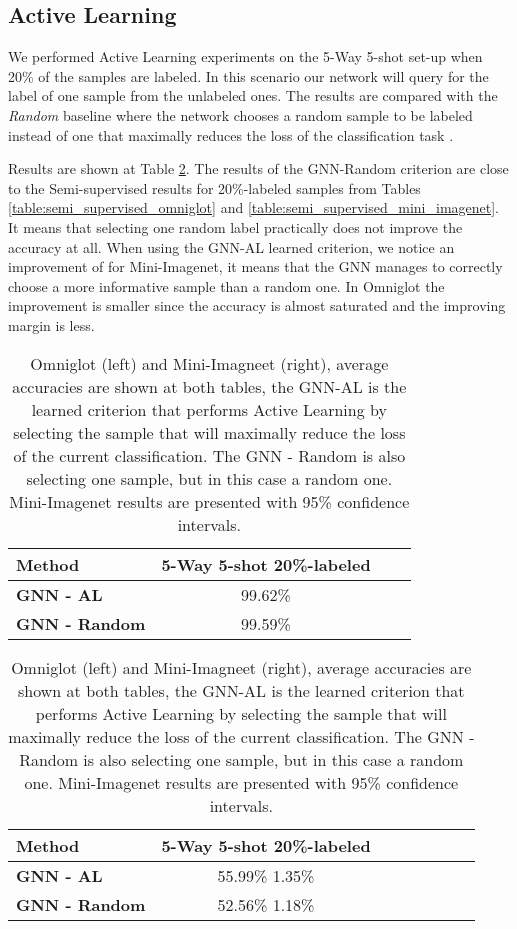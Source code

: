 \documentclass{article} \usepackage{iclr2018_conference,times}
\begin{document}
\subsection{Active Learning}
We performed Active Learning experiments on the 5-Way 5-shot set-up when 20\% of the samples are labeled. In this scenario our network will query for the label of one sample from the unlabeled ones. The results are compared with the \textit{Random} baseline where the network chooses a random sample to be labeled instead of one that maximally reduces the loss of the classification task .

Results are shown at Table \ref{fig:dummy_gaussian_warm}. The results of the GNN-Random criterion are close to the Semi-supervised results for 20\%-labeled samples from Tables \ref{table:semi_supervised_omniglot} and \ref{table:semi_supervised_mini_imagenet}. It means that selecting one random label practically does not improve the accuracy at all. When using the GNN-AL learned criterion, we notice an improvement of  for Mini-Imagenet, it means that the GNN manages to correctly choose a more informative sample than a random one. In Omniglot the improvement is smaller since the accuracy is almost saturated and the improving margin is less.


\begin{table}[!htb]
    \centering
    \tabcolsep=0.11cm
    \begin{tabular}{l*{2}{c}r}
    
    \textbf{Method}             & \textbf{5-Way 5-shot 20\%-labeled}   \\
    \hline
     \textbf{GNN - AL} & 99.62\%    \\
     \textbf{GNN - Random} & 99.59\%   \\

    \end{tabular}
\endminipage\hfill
{}
    \centering
    \tabcolsep=0.11cm
    \begin{tabular}{l*{6}{c}r}
    \textbf{Method}             & \textbf{5-Way 5-shot 20\%-labeled}   \\
    \hline
     \textbf{GNN - AL} & 55.99\% 1.35\%   \\
    \textbf{GNN - Random} & 52.56\% 1.18\%  \\

    \end{tabular}
\endminipage\hfill
\caption{Omniglot (left) and Mini-Imagneet (right), average accuracies are shown at both tables, the GNN-AL is the learned criterion that performs Active Learning by selecting the sample that will maximally reduce the loss of the current classification. The GNN - Random is also selecting one sample, but in this case a random one. Mini-Imagenet results are presented with 95\% confidence intervals.}
\label{fig:dummy_gaussian_warm}
\end{table} 
 
\end{document}
